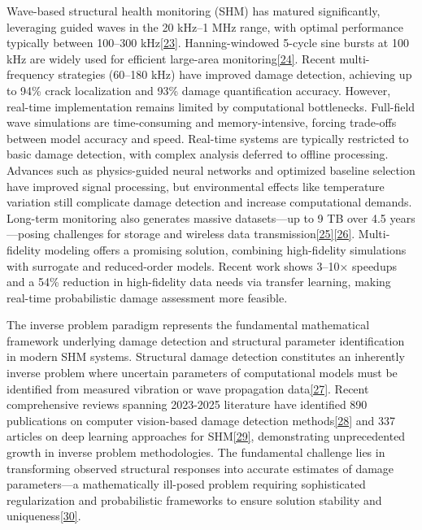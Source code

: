 \documentclass[12pt,a4paper]{report}
\begin{document}
Wave-based structural health monitoring (SHM) has matured significantly, leveraging guided waves in the 20 kHz–1 MHz range, with optimal performance typically between 100–300 kHz\href{https://royalsocietypublishing.org/doi/abs/10.1098/rspa.2007.0048}{[23]}. Hanning-windowed 5-cycle sine bursts at 100 kHz are widely used for efficient large-area monitoring\href{https://www.sciencedirect.com/science/article/pii/S0020740322004921}{[24]}. Recent multi-frequency strategies (60–180 kHz) have improved damage detection, achieving up to 94\% crack localization and 93\% damage quantification accuracy.
However, real-time implementation remains limited by computational bottlenecks. Full-field wave simulations are time-consuming and memory-intensive, forcing trade-offs between model accuracy and speed. Real-time systems are typically restricted to basic damage detection, with complex analysis deferred to offline processing.
Advances such as physics-guided neural networks and optimized baseline selection have improved signal processing, but environmental effects like temperature variation still complicate damage detection and increase computational demands. Long-term monitoring also generates massive datasets—up to 9 TB over 4.5 years—posing challenges for storage and wireless data transmission\href{https://pmc.ncbi.nlm.nih.gov/articles/PMC12162875/}{[25]}\href{https://www.researchgate.net/publication/359193759_Temperature_variation_compensated_damage_classification_and_localisation_in_ultrasonic_guided_wave_SHM_using_self-learnt_features_and_Gaussian_mixture_models}{[26]}.
Multi-fidelity modeling offers a promising solution, combining high-fidelity simulations with surrogate and reduced-order models. Recent work shows 3–10× speedups and a 54\% reduction in high-fidelity data needs via transfer learning, making real-time probabilistic damage assessment more feasible.

The inverse problem paradigm represents the fundamental mathematical framework underlying damage detection and structural parameter identification in modern SHM systems. Structural damage detection constitutes an inherently inverse problem where uncertain parameters of computational models must be identified from measured vibration or wave propagation data\href{https://royalsocietypublishing.org/doi/10.1098/rsta.2006.1930}{[27]}. Recent comprehensive reviews spanning 2023-2025 literature have identified 890 publications on computer vision-based damage detection methods\href{https://link.springer.com/article/10.1007/s11831-025-10279-8}{[28]} and 337 articles on deep learning approaches for SHM\href{https://pmc.ncbi.nlm.nih.gov/articles/PMC10650096/}{[29]}, demonstrating unprecedented growth in inverse problem methodologies. The fundamental challenge lies in transforming observed structural responses into accurate estimates of damage parameters—a mathematically ill-posed problem requiring sophisticated regularization and probabilistic frameworks to ensure solution stability and uniqueness\href{https://royalsocietypublishing.org/doi/10.1098/rspa.2021.0526}{[30]}.
\end{document}
